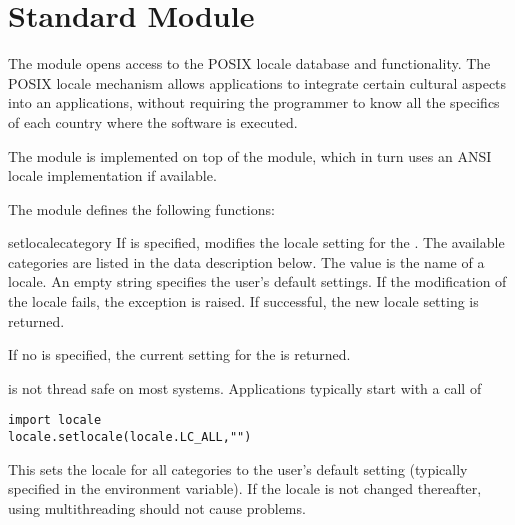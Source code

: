 \section{Standard Module }

\label{module-locale}

The  module opens access to the POSIX locale database and
functionality. The POSIX locale mechanism allows applications to
integrate certain cultural aspects into an applications, without
requiring the programmer to know all the specifics of each country
where the software is executed.

The  module is implemented on top of the 
module, which in turn uses an ANSI \C{} locale implementation if
available.

The  module defines the following functions:

\renewcommand{\indexsubitem}{(in module locale)}

\begin{funcdesc}{setlocale}{category}
If  is specified, modifies the locale setting for the
. The available categories are listed in the data
description below. The value is the name of a locale. An empty string
specifies the user's default settings. If the modification of the
locale fails, the exception  is
raised. If successful, the new locale setting is returned.

If no  is specified, the current setting for the
 is returned.

 is not thread safe on most systems. Applications
typically start with a call of
\bcode\begin{verbatim}
import locale
locale.setlocale(locale.LC_ALL,"")
\end{verbatim}\ecode
This sets the locale for all categories to the user's default setting
(typically specified in the  environment variable). If the
locale is not changed thereafter, using multithreading should not
cause problems.
\end{funcdesc}

